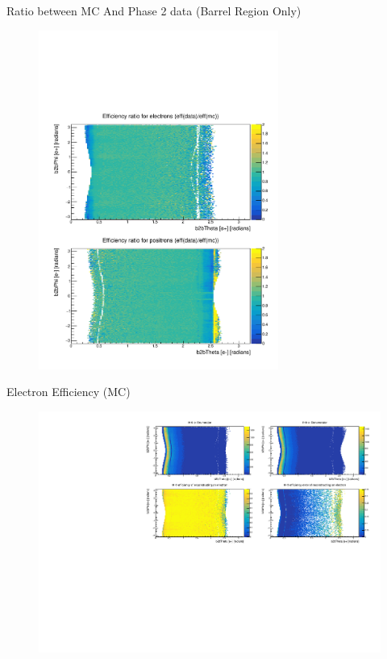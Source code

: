 \documentclass[10pt]{beamer}
\begin{document}
\begin{frame}{Ratio between MC And Phase 2 data (Barrel Region Only)}
	\begin{figure}
		\centering
		\includegraphics[width=0.7\textwidth]{Plots/Eff/Ratio2d.pdf}
		
	\end{figure}
\end{frame}





\begin{frame}{Electron Efficiency (MC)}
	
	\begin{figure}
		\centering
		\includegraphics[width=\textwidth]{Plots/Eff/TPemEff}
	\end{figure}
	
\end{frame}
\end{document}
